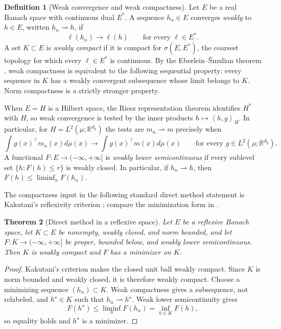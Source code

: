 \documentclass[11pt]{article}
\newcommand{\R}{\mathbb R}
\newcommand{\ip}[2]{\left\langle #1,#2\right\rangle}
\theoremstyle{plain}
\newtheorem{theorem}{Theorem}[section]
\theoremstyle{definition}
\newtheorem{definition}[theorem]{Definition}
\theoremstyle{remark}
\begin{document}
\begin{definition}[Weak convergence and weak compactness]
\label{def:app-weak-compactness}
Let $E$ be a real Banach space with continuous dual $E^*$. A sequence
$h_n\in E$ converges \emph{weakly} to $h\in E$, written
$h_n\rightharpoonup h$, if
\[
 \ell(h_n)\longrightarrow\ell(h)
 \qquad\text{for every }\ell\in E^*.
\]
A set $K\subset E$ is \emph{weakly compact} if it is compact for
$\sigma(E,E^*)$, the coarsest topology for which every $\ell\in E^*$ is
continuous. By the Eberlein--\v Smulian theorem
\cite[Chapter~3, Problem~10]{BrezisFA}, weak compactness is equivalent to the
following sequential property: every sequence in $K$ has a weakly convergent
subsequence whose limit belongs to $K$. Norm compactness is a strictly stronger
property.

When $E=H$ is a Hilbert space, the Riesz representation theorem identifies
$H^*$ with $H$, so weak convergence is tested by the inner products
$h\mapsto\ip{h}{g}_H$. In particular, for
$H=L^2(\mu;\R^{d_y})$ the tests are
$m_n\rightharpoonup m$ precisely when
\[
 \int g(x)^\top m_n(x)d\mu(x)
 \longrightarrow
 \int g(x)^\top m(x)d\mu(x)
 \qquad\text{for every }g\in L^2(\mu;\R^{d_y}).
\]
A functional $F:E\to(-\infty,+\infty]$ is \emph{weakly lower semicontinuous}
if every sublevel set $\{h:F(h)\le r\}$ is weakly closed.  In particular, if
$h_n\rightharpoonup h$, then $F(h)\le\liminf_nF(h_n)$.
\end{definition}

The compactness input in the following standard direct method statement is
Kakutani's reflexivity criterion \cite[Theorem~3.17]{BrezisFA}; compare the
minimization form in \cite[Corollaries~3.22--3.23]{BrezisFA}.

\begin{theorem}[Direct method in a reflexive space]
\label{thm:app-direct-method}
Let $E$ be a reflexive Banach space, let $K\subset E$ be nonempty, weakly closed,
and norm bounded, and let $F:K\to(-\infty,+\infty]$ be proper, bounded below,
and weakly lower semicontinuous.  Then $K$ is weakly compact and $F$ has a
minimizer on $K$.
\end{theorem}

\begin{proof}
Kakutani's criterion makes the closed unit ball weakly compact. Since $K$ is
norm bounded and weakly closed, it is therefore weakly compact. Choose a minimizing
sequence $(h_n)\subset K$.  Weak compactness gives a subsequence, not relabeled,
and $h^\star\in K$ such that $h_n\rightharpoonup h^\star$.  Weak lower
semicontinuity gives
\[
 F(h^\star)\le\liminf_nF(h_n)=\inf_{h\in K}F(h),
\]
so equality holds and $h^\star$ is a minimizer.
\end{proof}
\end{document}
